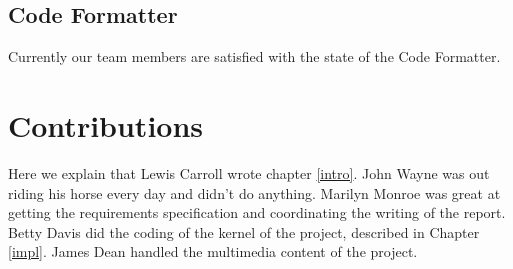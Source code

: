 \documentclass{l3proj}
\begin{document}
\subsection{Code Formatter}
Currently our team members are satisfied with the state of the Code Formatter. 
\section{Contributions}

Here we explain that Lewis Carroll wrote chapter \ref{intro}. John Wayne
was out riding his horse every day and didn't do anything. Marilyn Monroe
was great at getting the requirements specification and coordinating the
writing of the report. Betty Davis did the coding of the kernel of the
project, described in Chapter \ref{impl}.  James Dean handled the
multimedia content of the project.



\end{document}
